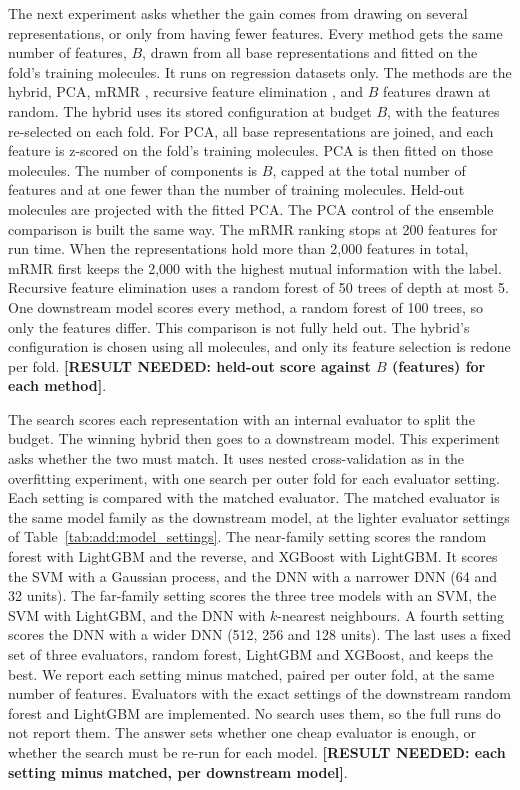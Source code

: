 The next experiment asks whether the gain comes from drawing on several representations, or only from having fewer features. Every method gets the same number of features, $B$, drawn from all base representations and fitted on the fold's training molecules. It runs on regression datasets only. The methods are the hybrid, PCA, mRMR \citep{Peng2005}, recursive feature elimination \citep{Guyon2002}, and $B$ features drawn at random. The hybrid uses its stored configuration at budget $B$, with the features re-selected on each fold. For PCA, all base representations are joined, and each feature is z-scored on the fold's training molecules. PCA is then fitted on those molecules. The number of components is $B$, capped at the total number of features and at one fewer than the number of training molecules. Held-out molecules are projected with the fitted PCA. The PCA control of the ensemble comparison is built the same way. The mRMR ranking stops at 200 features for run time. When the representations hold more than 2,000 features in total, mRMR first keeps the 2,000 with the highest mutual information with the label. Recursive feature elimination uses a random forest of 50 trees of depth at most 5. One downstream model scores every method, a random forest of 100 trees, so only the features differ. This comparison is not fully held out. The hybrid's configuration is chosen using all molecules, and only its feature selection is redone per fold. \textbf{[RESULT NEEDED: held-out score against $B$ (features) for each method]}.

The search scores each representation with an internal evaluator to split the budget. The winning hybrid then goes to a downstream model. This experiment asks whether the two must match. It uses nested cross-validation as in the overfitting experiment, with one search per outer fold for each evaluator setting. Each setting is compared with the matched evaluator. The matched evaluator is the same model family as the downstream model, at the lighter evaluator settings of Table~\ref{tab:add:model_settings}. The near-family setting scores the random forest with LightGBM and the reverse, and XGBoost with LightGBM. It scores the SVM with a Gaussian process, and the DNN with a narrower DNN (64 and 32 units). The far-family setting scores the three tree models with an SVM, the SVM with LightGBM, and the DNN with $k$-nearest neighbours. A fourth setting scores the DNN with a wider DNN (512, 256 and 128 units). The last uses a fixed set of three evaluators, random forest, LightGBM and XGBoost, and keeps the best. We report each setting minus matched, paired per outer fold, at the same number of features. Evaluators with the exact settings of the downstream random forest and LightGBM are implemented. No search uses them, so the full runs do not report them. The answer sets whether one cheap evaluator is enough, or whether the search must be re-run for each model. \textbf{[RESULT NEEDED: each setting minus matched, per downstream model]}.

